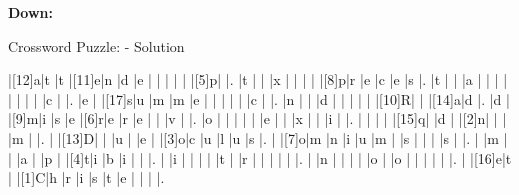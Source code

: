 \documentclass[12pt]{article}
\begin{document}
\begin{PuzzleClues}{\textbf{Down:}}
\end{PuzzleClues}
\newpage
\begin{center}
  \huge{Crossword Puzzle: - Solution}
\end{center}
\vspace{1.5cm}
\PuzzleSolution
\begin{Puzzle}{15}{15}
  |[12]a|t   |t   |[11]e|n   |d   |e   |{}  |{}  |{}  |{}  |{}  |[5]p|{}  |.
  |t   |{}  |{}  |x   |{}  |{}  |{}  |{}  |[8]p|r   |e   |c   |e   |s   |.
  |t   |{}  |{}  |a   |{}  |{}  |{}  |{}  |{}  |{}  |{}  |{}  |c   |{}  |.
  |e   |{}  |[17]s|u   |m   |m   |e   |{}  |{}  |{}  |{}  |{}  |c   |{}  |.
  |n   |{}  |{}  |d   |{}  |{}  |{}  |{}  |{}  |[10]R|{}  |{}  |[14]a|d   |.
  |d   |{}  |[9]m|i   |s   |e   |[6]r|e   |r   |e   |{}  |{}  |v   |{}  |.
  |o   |{}  |{}  |{}  |{}  |{}  |e   |{}  |{}  |x   |{}  |{}  |i   |{}  |.
  |{}  |{}  |{}  |{}  |[15]q|{}  |d   |{}  |[2]n|{}  |{}  |{}  |m   |{}  |.
  |{}  |[13]D|{}  |{}  |u   |{}  |e   |{}  |[3]o|c   |u   |l   |u   |s   |.
  |{}  |[7]o|m   |n   |i   |u   |m   |{}  |s   |{}  |{}  |{}  |s   |{}  |.
  |{}  |m   |{}  |{}  |a   |{}  |p   |{}  |[4]t|i   |b   |i   |{}  |{}  |.
  |{}  |i   |{}  |{}  |{}  |{}  |t   |{}  |r   |{}  |{}  |{}  |{}  |{}  |.
  |{}  |n   |{}  |{}  |{}  |{}  |o   |{}  |o   |{}  |{}  |{}  |{}  |{}  |.
  |{}  |[16]e|t   |{}  |[1]C|h   |r   |i   |s   |t   |e   |{}  |{}  |{}  |.
\end{Puzzle}
\end{document}
